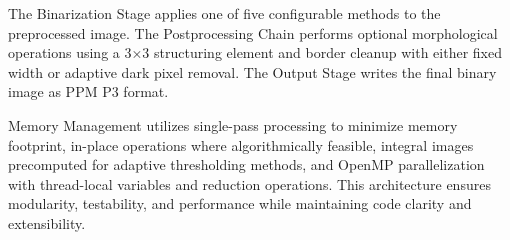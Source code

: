The Binarization Stage applies one of five configurable methods to the preprocessed image. The Postprocessing Chain performs optional morphological operations using a 3×3 structuring element and border cleanup with either fixed width or adaptive dark pixel removal. The Output Stage writes the final binary image as PPM P3 format.

Memory Management utilizes single-pass processing to minimize memory footprint, in-place operations where algorithmically feasible, integral images precomputed for adaptive thresholding methods, and OpenMP parallelization with thread-local variables and reduction operations. This architecture ensures modularity, testability, and performance while maintaining code clarity and extensibility.




